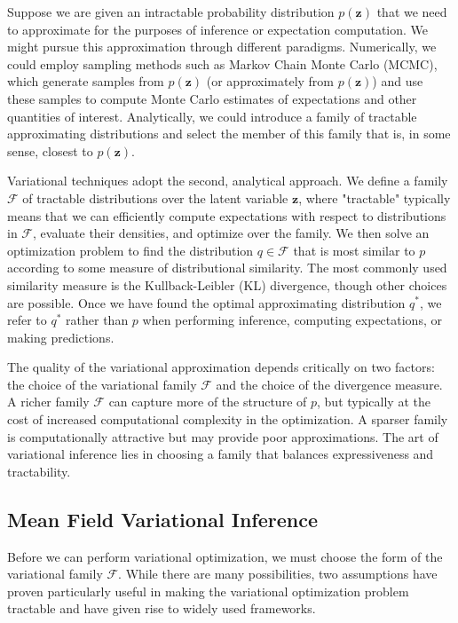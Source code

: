 Suppose we are given an intractable probability distribution $p(\mathbf{z})$ that we need to approximate for the purposes of inference or expectation computation. We might pursue this approximation through different paradigms. Numerically, we could employ sampling methods such as Markov Chain Monte Carlo (MCMC), which generate samples from $p(\mathbf{z})$ (or approximately from $p(\mathbf{z})$) and use these samples to compute Monte Carlo estimates of expectations and other quantities of interest. Analytically, we could introduce a family of tractable approximating distributions and select the member of this family that is, in some sense, closest to $p(\mathbf{z})$.

Variational techniques adopt the second, analytical approach. We define a family $\mathcal{F}$ of tractable distributions over the latent variable $\mathbf{z}$, where "tractable" typically means that we can efficiently compute expectations with respect to distributions in $\mathcal{F}$, evaluate their densities, and optimize over the family. We then solve an optimization problem to find the distribution $q \in \mathcal{F}$ that is most similar to $p$ according to some measure of distributional similarity. The most commonly used similarity measure is the Kullback-Leibler (KL) divergence, though other choices are possible. Once we have found the optimal approximating distribution $q^*$, we refer to $q^*$ rather than $p$ when performing inference, computing expectations, or making predictions.

The quality of the variational approximation depends critically on two factors: the choice of the variational family $\mathcal{F}$ and the choice of the divergence measure. A richer family $\mathcal{F}$ can capture more of the structure of $p$, but typically at the cost of increased computational complexity in the optimization. A sparser family is computationally attractive but may provide poor approximations. The art of variational inference lies in choosing a family that balances expressiveness and tractability.

\subsection*{Mean Field Variational Inference}

Before we can perform variational optimization, we must choose the form of the variational family $\mathcal{F}$. While there are many possibilities, two assumptions have proven particularly useful in making the variational optimization problem tractable and have given rise to widely used frameworks.

